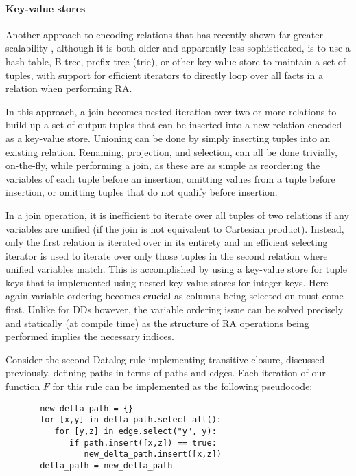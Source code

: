 \paragraph{Key-value stores} Another approach to encoding relations that has recently shown far greater scalability \cite{}, although it is both older and apparently less sophisticated, is to use a hash table, B-tree, prefix tree (trie), or other key-value store to maintain a set of tuples, with support for efficient iterators to directly loop over all facts in a relation when performing RA.

In this approach, a join becomes nested iteration over two or more relations to build up a set of output tuples that can be inserted into a new relation encoded as a key-value store. Unioning can be done by simply inserting tuples into an existing relation. Renaming, projection, and selection, can all be done trivially, on-the-fly, while performing a join, as these are as simple as reordering the variables of each tuple before an insertion, omitting values from a tuple before insertion, or omitting tuples that do not qualify before insertion.

In a join operation, it is inefficient to iterate over all tuples of two relations if any variables are unified (if the join is not equivalent to Cartesian product). Instead, only the first relation is iterated over in its entirety and an efficient selecting iterator is used to iterate over only those tuples in the second relation where unified variables match. This is accomplished by using a key-value store for tuple keys that is implemented using nested key-value stores for integer keys. Here again variable ordering becomes crucial as columns being selected on must come first. Unlike for DDs however, the variable ordering issue can be solved precisely and statically (at compile time) as the structure of RA operations being performed implies the necessary indices.

Consider the second Datalog rule implementing transitive closure, discussed previously, defining paths in terms of paths and edges. Each iteration of our function $F$ for this rule can be implemented as the following pseudocode:

\begin{verbatim}
       new_delta_path = {}
       for [x,y] in delta_path.select_all():
          for [y,z] in edge.select("y", y):
             if path.insert([x,z]) == true:
                new_delta_path.insert([x,z])
       delta_path = new_delta_path   
\end{verbatim}



